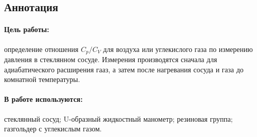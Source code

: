 \documentclass[a4paper,12pt]{report}
\begin{document}
    
    \newpage
    \pagestyle{fancy}

    \fancyhead{}
    \fancyfoot{}
    \fancyhead[L]{\rightmark}
    \fancyhead[R]{\thepage}

    
    \subsection*{Аннотация}
        \paragraph*{Цель работы:} определение отношения $C_p/C_V$ для воздуха или углекислого газа по измерению давления в стеклянном сосуде. Измерения производятся сначала для адиабатического расширения гааз, а затем после нагревания сосуда и газа до комнатной температуры.
        \paragraph*{В работе используются:} стеклянный сосуд; U-образный жидкостный манометр; резиновая группа; газгольдер с углекислым газом.
    
\end{document}
